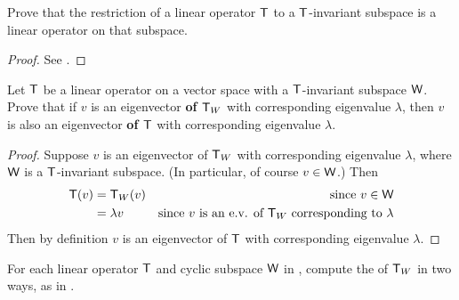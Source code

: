\begin{exercise} \label{exercise 5.4.7}
Prove that the restriction of a linear operator \(\textsf{T}\) to a \(\textsf{T}\)-invariant subspace is a linear operator on that subspace.
\end{exercise}

\begin{proof}
See .
\end{proof}

\begin{exercise} \label{exercise 5.4.8}
Let \(\textsf{T}\) be a linear operator on a vector space with a \(\textsf{T}\)-invariant subspace \(\textsf{W}\).
Prove that if \(v\) is an eigenvector \textbf{of \(\textsf{T}_W\)} with corresponding eigenvalue \(\lambda\), then \(v\) is also an eigenvector \textbf{of \(\textsf{T}\)} with corresponding eigenvalue \(\lambda\).
\end{exercise}

\begin{proof}
Suppose \(v\) is an eigenvector of \(\textsf{T}_W\) with corresponding eigenvalue \(\lambda\), where \(\textsf{W}\) is a \(\textsf{T}\)-invariant subspace.
(In particular, of course \(v \in \textsf{W}\).)
Then
\begin{align*}
    \textsf{T}(v) & = \textsf{T}_W(v) & \text{since \(v \in \textsf{W}\)} \\
          & = \lambda v & \text{since \(v\) is an e.v. of \(\textsf{T}_W\) corresponding to \(\lambda\)}
\end{align*}
Then by definition \(v\) is an eigenvector of \(\textsf{T}\) with corresponding eigenvalue \(\lambda\).
\end{proof}

\begin{exercise} \label{exercise 5.4.9}
For each linear operator \(\textsf{T}\) and cyclic subspace \(\textsf{W}\) in , compute the \CPOLY{} of \(\textsf{T}_W\) in two ways, as in .
\end{exercise}

